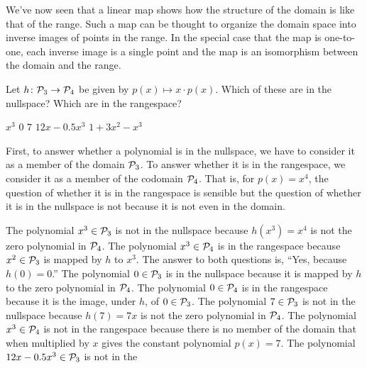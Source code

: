 We've now seen that a linear map
shows how the structure of the domain is like that of the range.
Such a map can be thought to organize the domain space into
inverse images of points in the range.
In the special case that the map is one-to-one, each inverse image is a single
point and the map is an isomorphism between the domain and the range.


\begin{exercises}
  \recommended \item 
    Let \( \mbox{$h\colon \mathcal{P}_3\to \mathcal{P}_4$} \) be
    given by \( p(x)\mapsto x\cdot p(x) \).
    Which of these are in the nullspace?
    Which are in the rangespace?
    \begin{exparts*}
      \partsitem \( x^3 \)
      \partsitem \( 0 \)
      \partsitem \( 7 \)
      \partsitem \( 12x-0.5x^3 \)
      \partsitem \( 1+3x^2-x^3 \)
    \end{exparts*}
    \begin{answer}
      First, to answer whether a polynomial is in the nullspace, 
      we have to consider it as a member of the domain $\mathcal{P}_3$.
      To answer whether it is in the rangespace, we consider it as a member of
      the codomain $\mathcal{P}_4$.
      That is, for $p(x)=x^4$, the question of whether it is in the rangespace
      is sensible but the question of whether it is in the nullspace is not
      because it is not even in the domain.
      \begin{exparts}
        \partsitem The polynomial $x^3\in\mathcal{P}_3$ is not in the nullspace
            because $h(x^3)=x^4$ is not the zero polynomial in $\mathcal{P}_4$.
            The polynomial $x^3\in\mathcal{P}_4$ is in the rangespace because
            $x^2\in\mathcal{P}_3$ is mapped by $h$ to $x^3$.
        \partsitem The answer to both questions is, ``Yes, because 
            $h(0)=0$.''
            The polynomial $0\in\mathcal{P}_3$ is in the nullspace
            because it is mapped by $h$ to the zero polynomial in 
            $\mathcal{P}_4$.
            The polynomial $0\in\mathcal{P}_4$ is in the rangespace because
            it is the image, under $h$, of $0\in\mathcal{P}_3$.
        \partsitem The polynomial $7\in\mathcal{P}_3$ is not in the nullspace
            because $h(7)=7x$ is not the zero polynomial in $\mathcal{P}_4$.
            The polynomial $x^3\in\mathcal{P}_4$ is not in the rangespace 
            because there is no member of the domain that when multiplied 
            by $x$ gives the constant polynomial $p(x)=7$.
        \partsitem The polynomial $12x-0.5x^3\in\mathcal{P}_3$ is not in the 

\end{exparts}
\end{answer}
\end{exercises}
